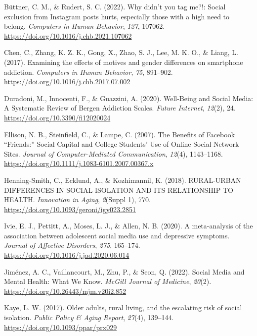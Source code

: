 \documentclass[]{interact}
\theoremstyle{plain}%
\theoremstyle{definition}
\theoremstyle{remark}
\newlength{\cslhangindent}
\newlength{\cslentryspacingunit} %
\newenvironment{CSLReferences}[2] %
 {%
  \setlength{\parindent}{0pt}
  \ifodd #1
  \let\oldpar\par
  \def\par{\hangindent=\cslhangindent\oldpar}
  \fi
  \setlength{\parskip}{#2\cslentryspacingunit}
 }%
 {}
\begin{document}
\begin{CSLReferences}{1}{0}
\leavevmode{}%
Büttner, C. M., \& Rudert, S. C. (2022). Why didn't you tag me?!: Social
exclusion from Instagram posts hurts, especially those with a high need
to belong. \emph{Computers in Human Behavior}, \emph{127}, 107062.
\url{https://doi.org/10.1016/j.chb.2021.107062}

\leavevmode{}%
Chen, C., Zhang, K. Z. K., Gong, X., Zhao, S. J., Lee, M. K. O., \&
Liang, L. (2017). Examining the effects of motives and gender
differences on smartphone addiction. \emph{Computers in Human Behavior},
\emph{75}, 891--902. \url{https://doi.org/10.1016/j.chb.2017.07.002}

\leavevmode{}%
Duradoni, M., Innocenti, F., \& Guazzini, A. (2020). Well-Being and
Social Media: A Systematic Review of Bergen Addiction Scales.
\emph{Future Internet}, \emph{12}(2), 24.
\url{https://doi.org/10.3390/fi12020024}

\leavevmode{}%
Ellison, N. B., Steinfield, C., \& Lampe, C. (2007). The Benefits of
Facebook {``}Friends:{''} Social Capital and College Students{'} Use of
Online Social Network Sites. \emph{Journal of Computer-Mediated
Communication}, \emph{12}(4), 1143--1168.
\url{https://doi.org/10.1111/j.1083-6101.2007.00367.x}

\leavevmode{}%
Henning-Smith, C., Ecklund, A., \& Kozhimannil, K. (2018). RURAL-URBAN
DIFFERENCES IN SOCIAL ISOLATION AND ITS RELATIONSHIP TO HEALTH.
\emph{Innovation in Aging}, \emph{2}(Suppl 1), 770.
\url{https://doi.org/10.1093/geroni/igy023.2851}

\leavevmode{}%
Ivie, E. J., Pettitt, A., Moses, L. J., \& Allen, N. B. (2020). A
meta-analysis of the association between adolescent social media use and
depressive symptoms. \emph{Journal of Affective Disorders}, \emph{275},
165--174. \url{https://doi.org/10.1016/j.jad.2020.06.014}

\leavevmode{}%
Jiménez, A. C., Vaillancourt, M., Zhu, P., \& Seon, Q. (2022). Social
Media and Mental Health: What We Know. \emph{McGill Journal of
Medicine}, \emph{20}(2). \url{https://doi.org/10.26443/mjm.v20i2.852}

\leavevmode{}%
Kaye, L. W. (2017). Older adults, rural living, and the escalating risk
of social isolation. \emph{Public Policy \& Aging Report}, \emph{27}(4),
139--144. \url{https://doi.org/10.1093/ppar/prx029}


\end{CSLReferences}
\end{document}
